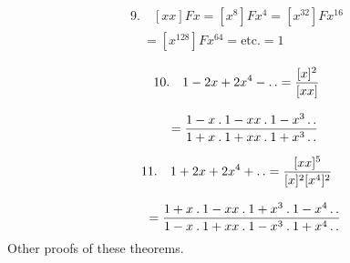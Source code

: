 \[
\begin{gathered}9.\quad [xx]Fx=[x^8]Fx^4=[x^{32}]Fx^{16}\\[8pt]\quad{}=[x^{128}]Fx^{64}=\mathrm{etc.}=1\end{gathered}
\]

\[
\begin{gathered}10.\quad1-2x+2x^4-\mathinner{.\,.}
=\frac{[x]^2}{[xx]}
\\[8pt]\quad{}=\frac{1-x\mathbin{.}1-xx\mathbin{.}1-x^3\mathinner{.\,.}}
{1+x\mathbin{.}1+xx\mathbin{.}1+x^3\mathinner{.\,.}}\end{gathered}
\]

\[
\begin{gathered}11.\quad1+2x+2x^4+\mathinner{.\,.}
=\frac{[xx]^5}{[x]^2[x^4]^2}
\\[8pt]\quad{}=\frac{1+x\mathbin{.}1-xx\mathbin{.}1+x^3\mathbin{.}1-x^4\mathinner{.\,.}}
{1-x\mathbin{.}1+xx\mathbin{.}1-x^3\mathbin{.}1+x^4\mathinner{.\,.}}\end{gathered}
\]
Other proofs of these theorems.


